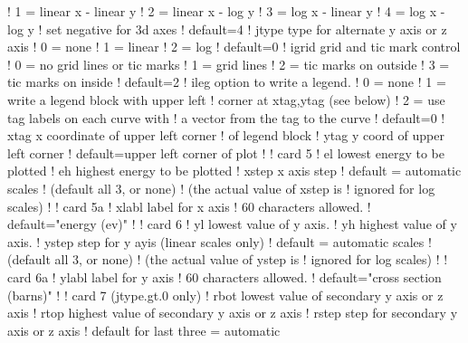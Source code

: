 \begin{ccode}
   !                     1 = linear x - linear y
   !                     2 = linear x - log y
   !                     3 = log x - linear y
   !                     4 = log x - log y
   !                     set negative for 3d axes
   !                     default=4
   !     jtype         type for alternate y axis or z axis
   !                     0 = none
   !                     1 = linear
   !                     2 = log
   !                     default=0
   !     igrid         grid and tic mark control
   !                     0 = no grid lines or tic marks
   !                     1 = grid lines
   !                     2 = tic marks on outside
   !                     3 = tic marks on inside
   !                     default=2
   !     ileg          option to write a legend.
   !                     0 = none
   !                     1 = write a legend block with upper left
   !                         corner at xtag,ytag (see below)
   !                     2 = use tag labels on each curve with
   !                         a vector from the tag to the curve
   !                     default=0
   !     xtag          x coordinate of upper left corner
   !                   of legend block
   !     ytag          y coord of upper left corner
   !                   default=upper left corner of plot
   !
   !  card 5
   !     el            lowest energy to be plotted
   !     eh            highest energy to be plotted
   !     xstep         x axis step
   !                   default = automatic scales
   !                   (default all 3, or none)
   !                   (the actual value of xstep is
   !                       ignored for log scales)
   !
   !  card 5a
   !     xlabl         label for x axis
   !                   60 characters allowed.
   !                    default="energy (ev)"
   !
   !  card 6
   !     yl            lowest value of y axis.
   !     yh            highest value of y axis.
   !     ystep         step for y ayis (linear scales only)
   !                   default = automatic scales
   !                   (default all 3, or none)
   !                   (the actual value of ystep is
   !                       ignored for log scales)
   !
   !  card 6a
   !     ylabl         label for y axis
   !                   60 characters allowed.
   !                    default="cross section (barns)"
   !
   !  card 7   (jtype.gt.0 only)
   !     rbot          lowest value of secondary y axis or z axis
   !     rtop          highest value of secondary y axis or z axis
   !     rstep         step for secondary y axis or z axis
   !                   default for last three = automatic

\end{ccode}
